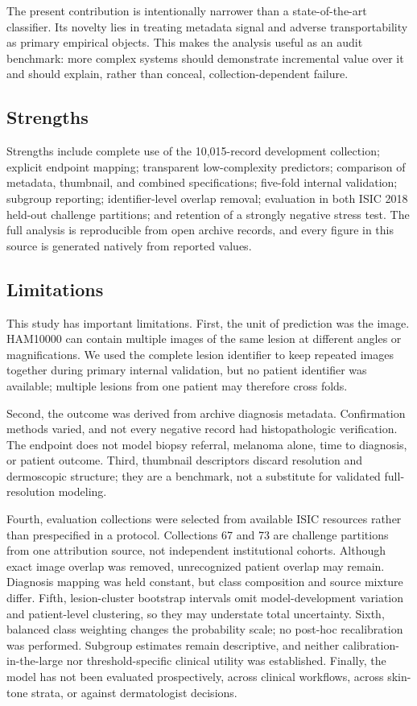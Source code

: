 \documentclass[11pt]{article}
\begin{document}
The present contribution is intentionally narrower than a state-of-the-art classifier. Its novelty lies in treating metadata signal and adverse transportability as primary empirical objects. This makes the analysis useful as an audit benchmark: more complex systems should demonstrate incremental value over it and should explain, rather than conceal, collection-dependent failure.

\subsection{Strengths}
Strengths include complete use of the 10,015-record development collection; explicit endpoint mapping; transparent low-complexity predictors; comparison of metadata, thumbnail, and combined specifications; five-fold internal validation; subgroup reporting; identifier-level overlap removal; evaluation in both ISIC 2018 held-out challenge partitions; and retention of a strongly negative stress test. The full analysis is reproducible from open archive records, and every figure in this source is generated natively from reported values.

\subsection{Limitations}
This study has important limitations. First, the unit of prediction was the image. HAM10000 can contain multiple images of the same lesion at different angles or magnifications.\cite{tschandl2018} We used the complete lesion identifier to keep repeated images together during primary internal validation, but no patient identifier was available; multiple lesions from one patient may therefore cross folds.

Second, the outcome was derived from archive diagnosis metadata. Confirmation methods varied, and not every negative record had histopathologic verification. The endpoint does not model biopsy referral, melanoma alone, time to diagnosis, or patient outcome. Third, thumbnail descriptors discard resolution and dermoscopic structure; they are a benchmark, not a substitute for validated full-resolution modeling.

Fourth, evaluation collections were selected from available ISIC resources rather than prespecified in a protocol. Collections 67 and 73 are challenge partitions from one attribution source, not independent institutional cohorts. Although exact image overlap was removed, unrecognized patient overlap may remain. Diagnosis mapping was held constant, but class composition and source mixture differ. Fifth, lesion-cluster bootstrap intervals omit model-development variation and patient-level clustering, so they may understate total uncertainty. Sixth, balanced class weighting changes the probability scale; no post-hoc recalibration was performed. Subgroup estimates remain descriptive, and neither calibration-in-the-large nor threshold-specific clinical utility was established. Finally, the model has not been evaluated prospectively, across clinical workflows, across skin-tone strata, or against dermatologist decisions.
\end{document}

